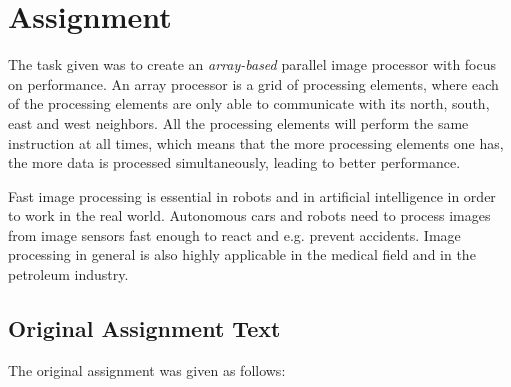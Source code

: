 \section{Assignment}
The task given was to create an {\em array-based} parallel image processor with
focus on performance. An array processor is a grid of processing elements, where
each of the processing elements are only able to communicate with its north,
south, east and west neighbors. All the processing elements will perform the
same instruction at all times, which means that the more processing elements one
has, the more data is processed simultaneously, leading to better performance.

Fast image processing is essential in robots\cite{miller1989r-vision,
  thrun2007stanley} and in artificial intelligence\cite{hwang1989parallel} in
order to work in the real world. Autonomous cars and robots need to process
images from image sensors fast enough to react and e.g. prevent
accidents\cite{aufrere2003coll-avoid}. Image processing in general is also
highly applicable in the medical field\cite{luong2009medical-image,
  sternberg1983biomedical} and in the petroleum
industry\cite{ferrari2007steam-images}.

\subsection{Original Assignment Text}

The original assignment was given as follows:


